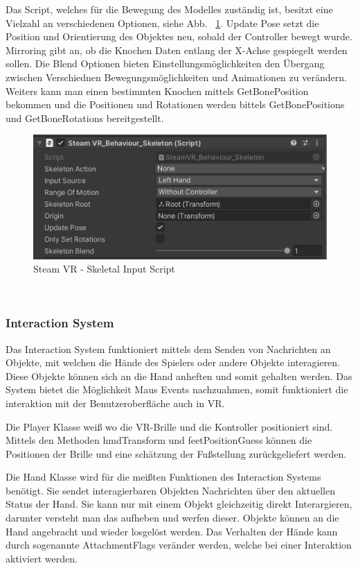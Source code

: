 Das Script, welches für die Bewegung des Modelles zuständig ist, besitzt eine Vielzahl an verschiedenen Optionen, siehe Abb. ~\ref{fig:steamvr_skeletal_input_Script}.
Update Pose setzt die Position und Orientierung des Objektes neu, sobald der Controller bewegt wurde.
Mirroring gibt an, ob die Knochen Daten entlang der X-Achse gespiegelt werden sollen.
Die Blend Optionen bieten Einstellungsmöglichkeiten den Übergang zwischen Verschiednen Bewegungsmöglichkeiten und Animationen zu verändern.
Weiters kann man einen bestimmten Knochen mittels GetBonePosition bekommen und die Positionen und Rotationen werden bittels GetBonePositions und GetBoneRotations bereitgestellt.
\begin {figure}
    \centering
    \includegraphics[scale=1]{pics/steamVR_skeletal_input_script}
    \caption{Steam VR - Skeletal Input Script}
    \label{fig:steamvr_skeletal_input_Script}
\end {figure}
~\cite{SteamVR_Skeleton_Input_2022}

\subsubsection{Interaction System}
Das Interaction System funktioniert mittels dem Senden von Nachrichten an Objekte, mit welchen die Hände des Spielers oder andere Objekte interagieren.
Diese Objekte können sich an die Hand anheften und somit gehalten werden.
Das System bietet die Möglichkeit Maus Events nachzuahmen, somit funktioniert die interaktion mit der Benutzeroberfläche auch in VR.

Die Player Klasse weiß wo die VR-Brille und die Kontroller positioniert sind.
Mittels den Methoden hmdTransform und feetPositionGuess können die Positionen der Brille und eine schätzung der Fußstellung zurückgeliefert werden.

Die Hand Klasse wird für die meißten Funktionen des Interaction Systems benötigt.
Sie sendet interagierbaren Objekten Nachrichten über den aktuellen Status der Hand.
Sie kann nur mit einem Objekt gleichzeitig direkt Interargieren, darunter versteht man das aufheben und werfen dieser.
Objekte können an die Hand angebracht und wieder losgelöst werden.
Das Verhalten der Hände kann durch sogenannte AttachmentFlags veränder werden, welche bei einer Interaktion aktiviert werden.

